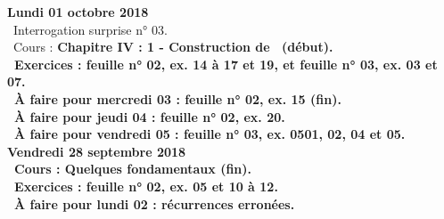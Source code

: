 \documentclass[12pt,a4paper]{article}
\begin{document}
% 
% 
% 
% 
% 

\noindent\textbf{\bf Lundi 01 octobre 2018}\\
\bu\ Interrogation surprise n° 03.\\
\bu\ Cours : \bf Chapitre IV \rm : 1 - Construction de \C\ (début).\\
\bu\ Exercices : feuille n° 02, ex. 14 à 17 et 19, et feuille n° 03, ex. 03 et 07.\\
\bu\ À faire pour mercredi 03 : feuille n° 02, ex. 15 (fin).\\
\bu\ À faire pour jeudi 04 : feuille n° 02, ex. 20.\\
\bu\ À faire pour vendredi 05 : feuille n° 03, ex. 0501, 02, 04 et 05.\vspace{.4cm}\\ 

\noindent\textbf{Vendredi 28 septembre 2018}\\
\bu\ Cours : Quelques fondamentaux (fin).\\
\bu\ Exercices : feuille n° 02, ex. 05 et 10 à 12.\\
\bu\ À faire pour lundi 02 : récurrences erronées.\vspace{.4cm}\\
\end{document}
